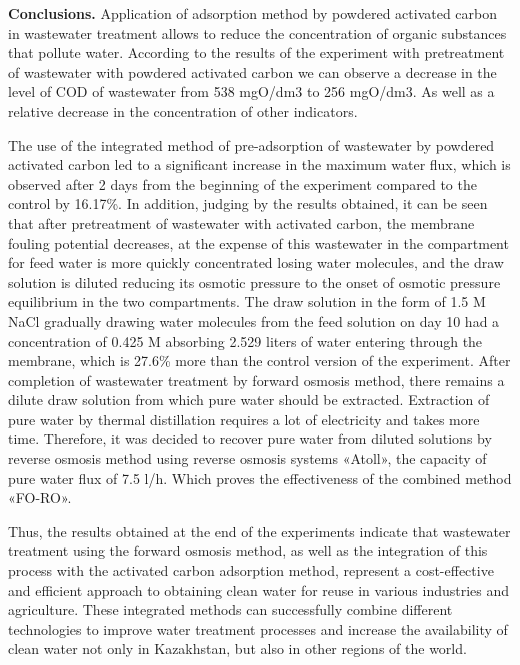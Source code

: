 \begin{multicols}{2}
{\bfseries Conclusions.} Application of adsorption method by powdered
activated carbon in wastewater treatment allows to reduce the
concentration of organic substances that pollute water. According to the
results of the experiment with pretreatment of wastewater with powdered
activated carbon we can observe a decrease in the level of COD of
wastewater from 538 mgO/dm3 to 256 mgO/dm3. As well as a relative
decrease in the concentration of other indicators.

The use of the integrated method of pre-adsorption of wastewater by
powdered activated carbon led to a significant increase in the maximum
water flux, which is observed after 2 days from the beginning of the
experiment compared to the control by 16.17\%. In addition, judging by
the results obtained, it can be seen that after pretreatment of
wastewater with activated carbon, the membrane fouling potential
decreases, at the expense of this wastewater in the compartment for feed
water is more quickly concentrated losing water molecules, and the draw
solution is diluted reducing its osmotic pressure to the onset of
osmotic pressure equilibrium in the two compartments. The draw solution
in the form of 1.5 M NaCl gradually drawing water molecules from the
feed solution on day 10 had a concentration of 0.425 M absorbing 2.529
liters of water entering through the membrane, which is 27.6\% more than
the control version of the experiment. After completion of wastewater
treatment by forward osmosis method, there remains a dilute draw
solution from which pure water should be extracted. Extraction of pure
water by thermal distillation requires a lot of electricity and takes
more time. Therefore, it was decided to recover pure water from diluted
solutions by reverse osmosis method using reverse osmosis systems
«Atoll», the capacity of pure water flux of 7.5 l/h. Which proves the
effectiveness of the combined method «FO-RO».

Thus, the results obtained at the end of the experiments indicate that
wastewater treatment using the forward osmosis method, as well as the
integration of this process with the activated carbon adsorption method,
represent a cost-effective and efficient approach to obtaining clean
water for reuse in various industries and agriculture. These integrated
methods can successfully combine different technologies to improve water
treatment processes and increase the availability of clean water not
only in Kazakhstan, but also in other regions of the world.
\end{multicols}

